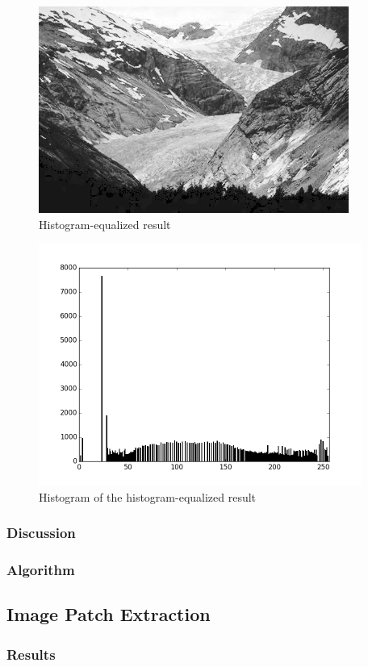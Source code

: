 \documentclass{article}
\begin{document}
\begin{figure}[H]
\centering
\includegraphics[width=288pt]{../result/equalize.png}
\caption{Histogram-equalized result}
\end{figure}

\begin{figure}[H]
\centering
\includegraphics[width=300pt]{../result/hist-equalize.png}
\caption{Histogram of the histogram-equalized result}
\end{figure}

\subsubsection{Discussion}
\subsubsection{Algorithm}


\subsection{Image Patch Extraction}
\subsubsection{Results}
\end{document}
